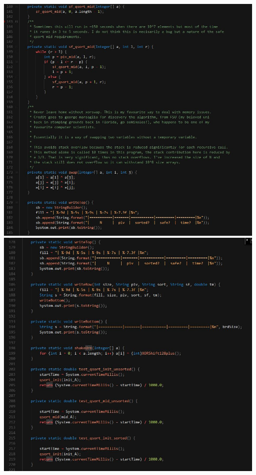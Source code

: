 \documentclass[paper=a4,fontsize=11pt]{article}
\begin{document}
\newpage
\includegraphics[width=\linewidth]{code5.jpg}
\newpage
\includegraphics[width=\linewidth]{code6.jpg}
\newpage
\end{document}
